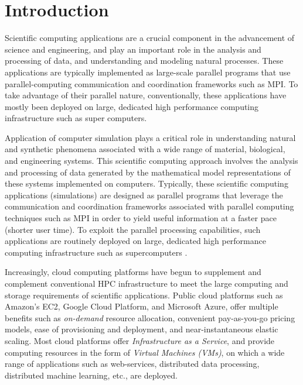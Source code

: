 \section{Introduction}


Scientific computing applications are a crucial component in the advancement of science and engineering, and play an important role in the analysis and processing of data, and understanding and modeling natural processes. 
These applications are typically implemented as large-scale parallel programs that use parallel-computing communication and coordination frameworks such as MPI.
To take advantage of their parallel nature, conventionally, these applications have mostly been deployed on large, dedicated high performance computing infrastructure such as super computers. 

\vikram
{
Application of computer simulation plays a critical role in understanding natural and synthetic phenomena associated with a wide range of material, biological, and engineering systems. This scientific computing approach involves the analysis and processing of data generated by the mathematical model representations of these systems implemented on computers. Typically, these scientific computing applications (simulations) are designed as parallel programs that leverage the communication and coordination frameworks associated with parallel computing techniques such as MPI in order to yield useful information at a faster pace (shorter user time). To exploit the parallel processing capabilities, such applications are routinely deployed on large, dedicated high performance computing infrastructure such as supercomputers \cite{bigred2,amherst,etc.}.
}



Increasingly, cloud computing platforms have begun to supplement  and complement  conventional HPC infrastructure  to meet the large computing and storage requirements of scientific applications. Public cloud platforms such as Amazon's EC2, Google Cloud Platform, and Microsoft Azure, offer multiple benefits such as \emph{on-demand} resource allocation, convenient pay-as-you-go pricing models, ease of provisioning and deployment, and near-instantaneous elastic scaling.
Most cloud platforms offer \emph{Infrastructure as a Service}, and provide computing resources in the form of \emph{Virtual Machines (VMs)}, on which a wide range of  applications such as web-services, distributed data processing, distributed machine learning, etc., are deployed. 

